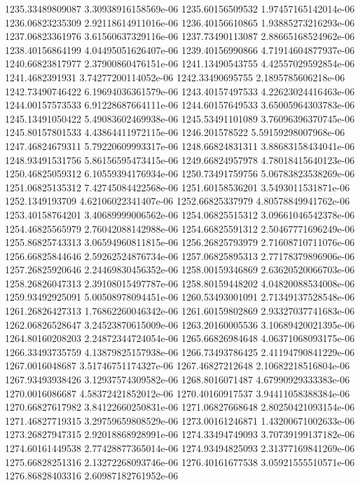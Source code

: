 {1235.33489809087 3.30938916158569e-06
1235.60156509532 1.97457165142014e-06
1236.06823235309 2.92118614911016e-06
1236.40156610865 1.93885273216293e-06
1237.06823361976 3.61560637329116e-06
1237.73490113087 2.88665168524962e-06
1238.40156864199 4.04495051626407e-06
1239.40156990866 4.71914604877937e-06
1240.66823817977 2.37900860476151e-06
1241.13490543755 4.42557029592854e-06
1241.4682391931 3.74277200114052e-06
1242.33490695755 2.1895785606218e-06
1242.73490746422 6.19694036361579e-06
1243.40157497533 4.22623024416463e-06
1244.00157573533 6.91228687664111e-06
1244.60157649533 3.65005964303783e-06
1245.13491050422 5.49083602469938e-06
1245.53491101089 3.76096396370745e-06
1245.80157801533 4.43864411972115e-06
1246.201578522 5.59159298007968e-06
1247.46824679311 5.79220609993317e-06
1248.66824831311 3.88683158434041e-06
1248.93491531756 5.86156595473415e-06
1249.66824957978 4.78018415640123e-06
1250.46825059312 6.10559394176934e-06
1250.73491759756 5.06783823538269e-06
1251.06825135312 7.42745084422568e-06
1251.60158536201 3.5493011531871e-06
1252.1349193709 4.62106022341407e-06
1252.66825337979 4.80578849941762e-06
1253.40158764201 3.40689999006562e-06
1254.06825515312 3.09661046542378e-06
1254.46825565979 2.76042088142988e-06
1254.66825591312 2.50467771696249e-06
1255.86825743313 3.06594960811815e-06
1256.26825793979 2.71608710711076e-06
1256.66825844646 2.59262524876734e-06
1257.06825895313 2.77178379896906e-06
1257.26825920646 2.24469830456352e-06
1258.00159346869 2.63620520066703e-06
1258.26826047313 2.39108015497787e-06
1258.80159448202 4.04820088534008e-06
1259.93492925091 5.00508978094451e-06
1260.53493001091 2.71349137528548e-06
1261.26826427313 1.76862260046342e-06
1261.60159802869 2.93327037741683e-06
1262.06826528647 3.24523870615009e-06
1263.20160005536 3.10689420021395e-06
1264.80160208203 2.24872344724054e-06
1265.66826984648 4.06371068093175e-06
1266.33493735759 4.13879825157938e-06
1266.73493786425 2.41194790841229e-06
1267.0016048687 3.51746751174327e-06
1267.46827212648 2.10682218516804e-06
1267.93493938426 3.12937574309582e-06
1268.8016071487 4.67990929333383e-06
1270.0016086687 4.58372421852012e-06
1270.40160917537 3.94411058388384e-06
1270.66827617982 3.84122660250831e-06
1271.06827668648 2.80250421093154e-06
1271.46827719315 3.29759659808529e-06
1273.00161246871 1.43200671002633e-06
1273.26827947315 2.92018868928991e-06
1274.33494749093 3.70739199137182e-06
1274.60161449538 2.77428877365014e-06
1274.93494825093 2.31377169841269e-06
1275.66828251316 2.13272268093746e-06
1276.40161677538 3.05921555510571e-06
1276.86828403316 2.60987182761952e-06
}
